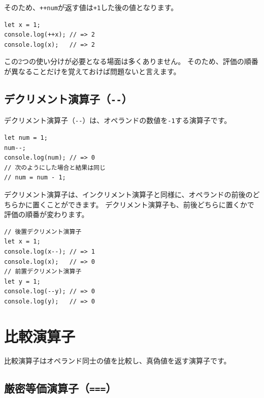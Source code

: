 そのため、\texttt{++num}が返す値は\texttt{+1}した後の値となります。

\begin{lstlisting}
let x = 1;
console.log(++x); // => 2
console.log(x);   // => 2
\end{lstlisting}

この2つの使い分けが必要となる場面は多くありません。
そのため、評価の順番が異なることだけを覚えておけば問題ないと言えます。

\hypertarget{decrement-operator}{%
\subsection{\texorpdfstring{デクリメント演算子（\texttt{-\/-}）}{デクリメント演算子（-\/-）}}\label{decrement-operator}}

デクリメント演算子（\texttt{-\/-}）は、オペランドの数値を\texttt{-1}する演算子です。

\begin{lstlisting}
let num = 1;
num--;
console.log(num); // => 0
// 次のようにした場合と結果は同じ
// num = num - 1;
\end{lstlisting}

デクリメント演算子は、インクリメント演算子と同様に、オペランドの前後のどちらかに置くことができます。
デクリメント演算子も、前後どちらに置くかで評価の順番が変わります。

\begin{lstlisting}
// 後置デクリメント演算子
let x = 1;
console.log(x--); // => 1
console.log(x);   // => 0
// 前置デクリメント演算子
let y = 1;
console.log(--y); // => 0
console.log(y);   // => 0
\end{lstlisting}

\hypertarget{comparison-operator}{%
\section{比較演算子}\label{comparison-operator}}

比較演算子はオペランド同士の値を比較し、真偽値を返す演算子です。

\hypertarget{strict-equal-operator}{%
\subsection{\texorpdfstring{厳密等価演算子（\texttt{===}）}{厳密等価演算子（===）}}\label{strict-equal-operator}}

